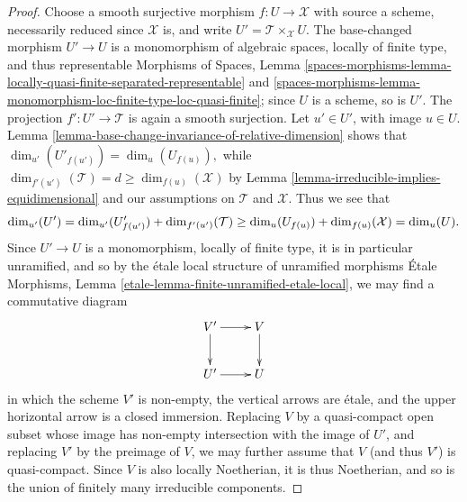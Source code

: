 \documentclass{stacks-project}
\theoremstyle{plain}
\theoremstyle{definition}
\theoremstyle{remark}
\numberwithin{equation}{subsection}
\begin{document}
\begin{proof}
Choose a smooth surjective morphism $f:U \to \mathcal{X}$ with source a scheme,
necessarily reduced since $\mathcal{X}$ is,
and write $U' = \mathcal{T}\times_{\mathcal{X}} U$.  The base-changed morphism
$U' \to U$ is a monomorphism of algebraic spaces, locally of finite
type, and thus representable
Morphisms of Spaces, Lemma
\ref{spaces-morphisms-lemma-locally-quasi-finite-separated-representable} and
\ref{spaces-morphisms-lemma-monomorphism-loc-finite-type-loc-quasi-finite};
since $U$ is a scheme, so is $U'$.
The projection $f': U' \to \mathcal{T}$ is again a smooth surjection.
Let $u' \in U'$, with image $u \in U$.
Lemma \ref{lemma-base-change-invariance-of-relative-dimension}
shows that $\dim_{u'}(U'_{f(u')}) = \dim_u(U_{f(u)}),$
while $\dim_{f'(u')}(\mathcal{T}) =d
\geq \dim_{f(u)}(\mathcal{X})$ by
Lemma \ref{lemma-irreducible-implies-equidimensional}
and our assumptions on $\mathcal{T}$ and $\mathcal{X}$.
Thus we see that
\begin{equation}
\label{equation-dim-inequality}
\dim_{u'} (U') = \dim_{u'} (U'_{f(u')}) + \dim_{f'(u')}(\mathcal{T})
\\
\geq \dim_u (U_{f(u)}) + \dim_{f(u)}(\mathcal{X}) = \dim_u (U).
\end{equation}
Since $U' \to U$ is a monomorphism, locally of finite type,
it is in particular unramified,
and so by the \'etale local structure of unramified morphisms
\'Etale Morphisms, Lemma \ref{etale-lemma-finite-unramified-etale-local},
we may find a commutative diagram
$$
\xymatrix{
V' \ar[r]\ar[d] & V \ar[d] \\
U' \ar[r] & U
}
$$
in which the scheme $V'$ is non-empty,
the vertical arrows are \'etale,
and the upper horizontal arrow is a closed immersion.
Replacing $V$ by a quasi-compact open subset
whose image has non-empty intersection with the image of $U'$,
and replacing $V'$ by the preimage of $V$, we may further
assume that $V$ (and thus $V'$) is quasi-compact.
Since $V$ is also locally Noetherian,
it is thus Noetherian, and so is the union of finitely many irreducible
components.


\end{proof}
\end{document}
